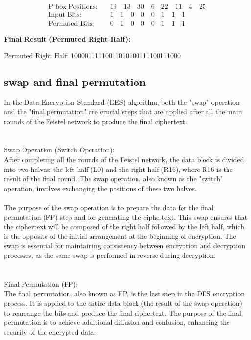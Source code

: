 \documentclass{report}
\begin{document}
{	\begin{align*}
		\text{P-box Positions:} & \quad 19 \quad 13 \quad 30 \quad 6 \quad 22 \quad 11 \quad 4 \quad 25 \\
		\text{Input Bits:} & \quad 1 \quad 1 \quad 0 \quad 0 \quad 0 \quad 1 \quad 1 \quad 1 \\
		\text{Permuted Bits:} & \quad 0 \quad 1 \quad 0 \quad 0 \quad 0 \quad 1 \quad 1 \quad 1
	\end{align*}
	
	\textbf{Final Result (Permuted Right Half):}
	
	Permuted Right Half: 10000111110011010100111100111000
}


\subsection{swap and final permutation}
In the Data Encryption Standard (DES) algorithm, both the "swap" operation and the "final permutation" are crucial steps that are applied after all the main rounds of the Feistel network to produce the final ciphertext.\\
\\
\\
Swap Operation (Switch Operation):\\
After completing all the rounds of the Feistel network, the data block is divided into two halves: the left half (L0) and the right half (R16), where R16 is the result of the final round. The swap operation, also known as the "switch" operation, involves exchanging the positions of these two halves.\\
\\
The purpose of the swap operation is to prepare the data for the final permutation (FP) step and for generating the ciphertext. This swap ensures that the ciphertext will be composed of the right half followed by the left half, which is the opposite of the initial arrangement at the beginning of encryption. The swap is essential for maintaining consistency between encryption and decryption processes, as the same swap is performed in reverse during decryption.\\
\\
\\
Final Permutation (FP):\\
The final permutation, also known as FP, is the last step in the DES encryption process. It is applied to the entire data block (the result of the swap operation) to rearrange the bits and produce the final ciphertext. The purpose of the final permutation is to achieve additional diffusion and confusion, enhancing the security of the encrypted data.\\
\end{document}

